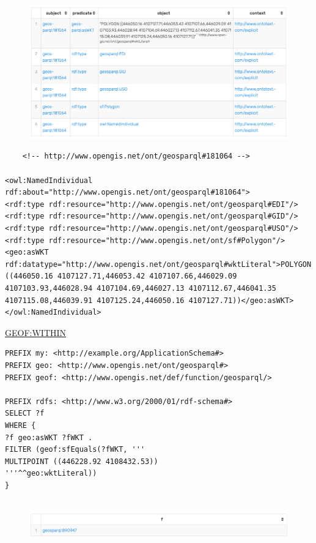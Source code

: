 \begin{figure}[H]
	\centering
	\includegraphics[width=0.7\linewidth]{imagenes/capitulo4/info-salida}
	\caption{}
	\label{fig:info-salida}
\end{figure}


\begin{lstlisting}
    <!-- http://www.opengis.net/ont/geosparql#181064 -->

<owl:NamedIndividual rdf:about="http://www.opengis.net/ont/geosparql#181064">
<rdf:type rdf:resource="http://www.opengis.net/ont/geosparql#EDI"/>
<rdf:type rdf:resource="http://www.opengis.net/ont/geosparql#GID"/>
<rdf:type rdf:resource="http://www.opengis.net/ont/geosparql#USO"/>
<rdf:type rdf:resource="http://www.opengis.net/ont/sf#Polygon"/>
<geo:asWKT rdf:datatype="http://www.opengis.net/ont/geosparql#wktLiteral">POLYGON ((446050.16 4107127.71,446053.42 4107107.66,446029.09 4107103.93,446028.94 4107104.69,446027.13 4107112.67,446041.35 4107115.08,446039.91 4107125.24,446050.16 4107127.71))</geo:asWKT>
</owl:NamedIndividual>
\end{lstlisting}

\underline{GEOF:WITHIN}

\begin{lstlisting}
PREFIX my: <http://example.org/ApplicationSchema#>
PREFIX geo: <http://www.opengis.net/ont/geosparql#>
PREFIX geof: <http://www.opengis.net/def/function/geosparql/>

PREFIX rdfs: <http://www.w3.org/2000/01/rdf-schema#>
SELECT ?f
WHERE {
?f geo:asWKT ?fWKT .
FILTER (geof:sfEquals(?fWKT, '''
MULTIPOINT ((446228.92 4108432.53))
'''^^geo:wktLiteral))
} 


\end{lstlisting}

\begin{figure}[H]
	\centering
	\includegraphics[width=0.7\linewidth]{imagenes/capitulo4/salida7}
	\caption{}
	\label{fig:salida7}
\end{figure}


